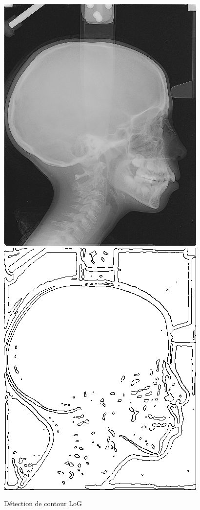 \documentclass[paper=a4, fontsize=11pt]{scrartcl} %
\begin{document}
\begin{figure}
\centering
\caption{Détection de contour LoG}
\label{Logavap}
\includegraphics[scale=0.5]{images/rapport/radio1.png} 
\includegraphics[scale=0.5]{images/rapport/coucou2.png}
\end{figure}
\end{document}
